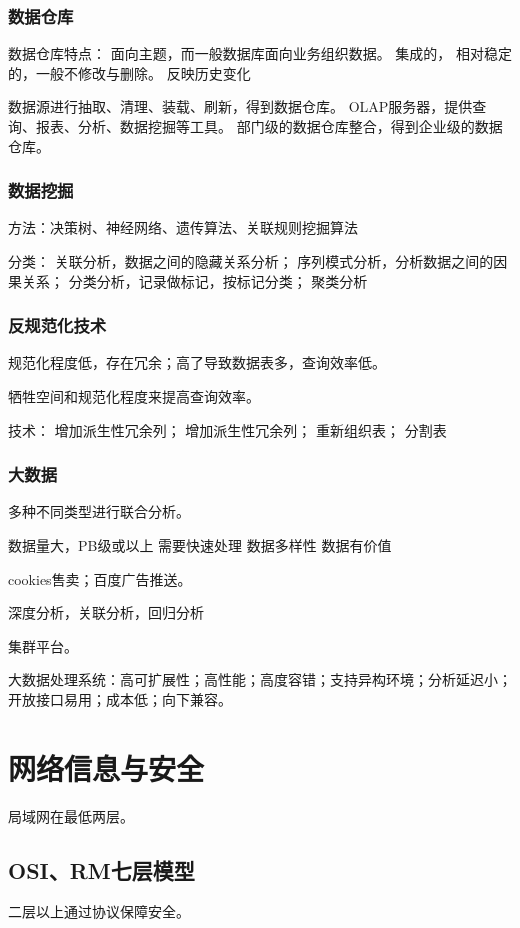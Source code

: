 \documentclass[UTF8]{article}
\begin{document}
\subsubsection{数据仓库}
数据仓库特点：
面向主题，而一般数据库面向业务组织数据。
集成的，
相对稳定的，一般不修改与删除。
反映历史变化

数据源进行抽取、清理、装载、刷新，得到数据仓库。
OLAP服务器，提供查询、报表、分析、数据挖掘等工具。
部门级的数据仓库整合，得到企业级的数据仓库。

\subsubsection{数据挖掘}
方法：决策树、神经网络、遗传算法、关联规则挖掘算法

分类：
关联分析，数据之间的隐藏关系分析；
序列模式分析，分析数据之间的因果关系；
分类分析，记录做标记，按标记分类；
聚类分析


\subsubsection{反规范化技术}
规范化程度低，存在冗余；高了导致数据表多，查询效率低。

牺牲空间和规范化程度来提高查询效率。

技术：
增加派生性冗余列；
增加派生性冗余列；
重新组织表；
分割表


\subsubsection{大数据}
多种不同类型进行联合分析。

数据量大，PB级或以上
需要快速处理
数据多样性
数据有价值

cookies售卖；百度广告推送。

深度分析，关联分析，回归分析

集群平台。

大数据处理系统：高可扩展性；高性能；高度容错；支持异构环境；分析延迟小；开放接口易用；成本低；向下兼容。

\section{网络信息与安全}

局域网在最低两层。
\subsection{OSI、RM七层模型}
二层以上通过协议保障安全。
\end{document}
